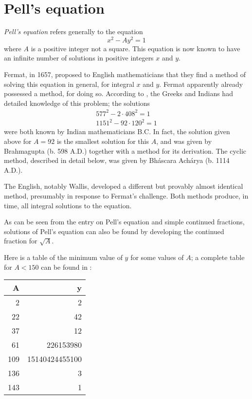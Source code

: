 \documentclass[12pt]{article}
\begin{document}
\section*{Pell's equation}
\emph{Pell's equation} refers generally to the equation
\[x^2-Ay^2=1\]
where $A$ is a positive integer not a square. This equation is now known to have an infinite number of solutions in positive integers $x$ and $y$.

Fermat, in 1657, proposed to English mathematicians that they find a method of solving this equation in general, for integral $x$ and $y$. Fermat apparently already possessed a method, for doing so. According to \cite{bib:edwards}, the Greeks and Indians had detailed knowledge of this problem; the solutions
\begin{align*}
577^2 - 2\cdot 408^2=1\\
1151^2-92\cdot 120^2=1
\end{align*}
were both known by Indian mathematicians B.C. In fact, the solution given above for $A=92$ is the smallest solution for this $A$, and was given by Brahmagupta (b. 598 A.D.) together with a method for its derivation. The cyclic method, described in detail below, was given by Bh\'{a}scara Ach\'{a}rya (b. 1114 A.D.).

The English, notably Wallis, developed a different but provably almost identical method, presumably in response to Fermat's challenge. Both methods produce, in time, all integral solutions to the equation.

As can be seen from the entry on Pell's equation and simple continued fractions, solutions of Pell's equation can also be found by developing the continued fraction for $\sqrt{A}$.

Here is a table of the minimum value of $y$ for some values of $A$; a complete table for $A<150$ can be found in \cite{bib:edwards}:\newline
\begin{center}
\begin{tabular}{|r|r|}
\hline
A&y\\
\hline
2&2\\
22&42\\
37&12\\
61&226153980\\
109&15140424455100\\
136&3\\
143&1\\
\hline
\end{tabular}
\end{center}
\end{document}
